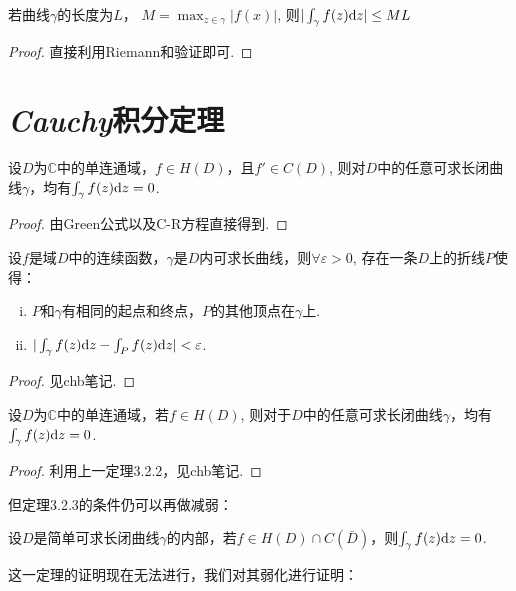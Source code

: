 \begin{theorem}[长大不等式]
	
	若曲线$\gamma$的长度为$L$， $M = \max_{z \in \gamma} \vert f(x) \vert$,
	则$ \vert \int_\gamma  f(z) \mathrm{d}z \vert \leq ML$
\end{theorem}
\begin{proof}
	直接利用Riemann和验证即可.
\end{proof}

\section{\emph{Cauchy}积分定理}
\begin{theorem}
	设$D$为$\mathbb{C}$中的单连通域，$f \in H(D)$，且$f' \in C(D)$, 则对$D$中的任意可求长闭曲线$\gamma$，均有$\int_\gamma f(z) \mathrm{d}z = 0$.
\end{theorem}
\begin{proof}
	由Green公式以及C-R方程直接得到.
\end{proof}

\begin{theorem}
	设$f$是域$D$中的连续函数，$\gamma$是$D$内可求长曲线，则$\forall \varepsilon > 0$, 存在一条$D$上的折线$P$使得：
	\begin{enumerate}[(i)]
		\item $P$和$\gamma$有相同的起点和终点，$P$的其他顶点在$\gamma$上.
		\item $\vert \int_\gamma f(z) \mathrm{d}z - \int_Pf(z) \mathrm{d}z \vert < \varepsilon $.
	\end{enumerate}
\end{theorem}
\begin{proof}
	见chb笔记.
\end{proof}

\begin{theorem}
	设$D$为$\mathbb C$中的单连通域，若$f \in H(D)$, 则对于$D$中的任意可求长闭曲线$\gamma$，均有$\int_\gamma f(z) \mathrm{d}z = 0$.
\end{theorem}
\begin{proof}
	利用上一定理3.2.2，见chb笔记.
\end{proof}

但定理3.2.3的条件仍可以再做减弱：
\begin{theorem}
	设$D$是简单可求长闭曲线$\gamma$的内部，若$f \in H(D) \cap C(\bar{D})$，则$\int_\gamma f(z) \mathrm{d}z = 0$.
\end{theorem}
这一定理的证明现在无法进行，我们对其弱化进行证明：

